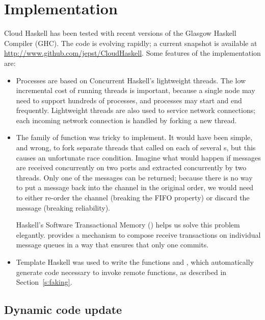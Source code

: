 \documentclass[preprint]{sigplanconf}
\begin{document}

\section{Implementation}
\label{s:Implementation}
Cloud Haskell has been tested with recent versions of the Glasgow Haskell Compiler (GHC). The code is evolving rapidly; a current snapshot is available at \url{http://www.github.com/jepst/CloudHaskell}. 
Some features of the implementation are:

\begin{itemize}
\item Processes are based on Concurrent Haskell's lightweight threads. The low incremental cost of running threads is important, because a single node may need to support hundreds of processes, and processes may start and end frequently. Lightweight threads are also used to service network connections; 
each incoming network connection is handled by forking a new thread.
\item The  family of function was tricky to implement. It would have been simple, and wrong, to fork separate threads that called  on each of several s, but this causes an unfortunate race condition. 
Imagine what would happen if messages are received concurrently on two ports and extracted concurrently by two threads. Only one of the messages can be returned;  because there is no way to put a message back into the channel in the original order, we would need to either re-order the channel (breaking the FIFO property) or discard the message (breaking reliability).

Haskell's Software Transactional Memory () helps us solve this problem elegantly.
 provides a mechanism to compose receive transactions on individual message queues in a way that ensures that only one commits.
\item Template Haskell was used to write the functions  and , which automatically generate code necessary to invoke remote functions, as described in Section~\ref{s:faking}.
\end{itemize}

\subsection{Dynamic code update} \label{s:code-update}
\end{document}

